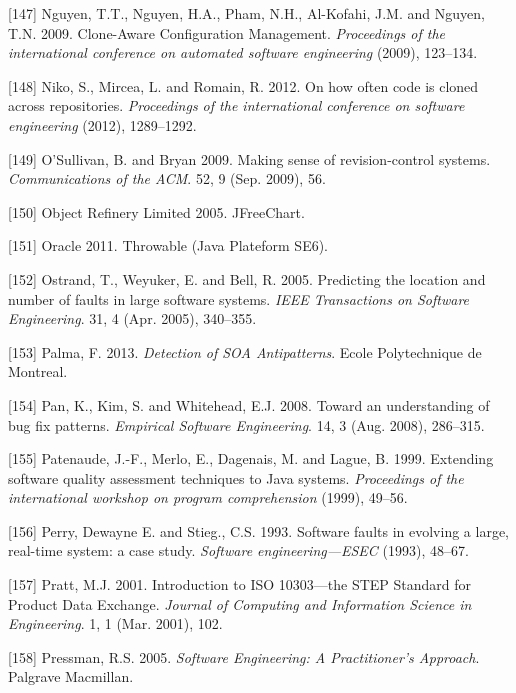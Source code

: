 \documentclass[12pt]{report}
\begin{document}
\hypertarget{ref-Nguyen2009}{}
{[}147{]} Nguyen, T.T., Nguyen, H.A., Pham, N.H., Al-Kofahi, J.M. and
Nguyen, T.N. 2009. Clone-Aware Configuration Management.
\emph{Proceedings of the international conference on automated software
engineering} (2009), 123--134.

\hypertarget{ref-Niko2012}{}
{[}148{]} Niko, S., Mircea, L. and Romain, R. 2012. On how often code is
cloned across repositories. \emph{Proceedings of the international
conference on software engineering} (2012), 1289--1292.

\hypertarget{ref-OSullivan2009}{}
{[}149{]} O'Sullivan, B. and Bryan 2009. Making sense of
revision-control systems. \emph{Communications of the ACM}. 52, 9 (Sep.
2009), 56.

\hypertarget{ref-ObjectRefineryLimited2005}{}
{[}150{]} Object Refinery Limited 2005. JFreeChart.

\hypertarget{ref-Oracle2011}{}
{[}151{]} Oracle 2011. Throwable (Java Plateform SE6).

\hypertarget{ref-Ostrand2005}{}
{[}152{]} Ostrand, T., Weyuker, E. and Bell, R. 2005. Predicting the
location and number of faults in large software systems. \emph{IEEE
Transactions on Software Engineering}. 31, 4 (Apr. 2005), 340--355.

\hypertarget{ref-Palma2013}{}
{[}153{]} Palma, F. 2013. \emph{Detection of SOA Antipatterns}. Ecole
Polytechnique de Montreal.

\hypertarget{ref-Pan2008}{}
{[}154{]} Pan, K., Kim, S. and Whitehead, E.J. 2008. Toward an
understanding of bug fix patterns. \emph{Empirical Software
Engineering}. 14, 3 (Aug. 2008), 286--315.

\hypertarget{ref-Patenaude1999}{}
{[}155{]} Patenaude, J.-F., Merlo, E., Dagenais, M. and Lague, B. 1999.
Extending software quality assessment techniques to Java systems.
\emph{Proceedings of the international workshop on program
comprehension} (1999), 49--56.

\hypertarget{ref-PerryDewayneE.1993}{}
{[}156{]} Perry, Dewayne E. and Stieg., C.S. 1993. Software faults in
evolving a large, real-time system: a case study. \emph{Software
engineering---ESEC} (1993), 48--67.

\hypertarget{ref-Pratt2001}{}
{[}157{]} Pratt, M.J. 2001. Introduction to ISO 10303---the STEP
Standard for Product Data Exchange. \emph{Journal of Computing and
Information Science in Engineering}. 1, 1 (Mar. 2001), 102.

\hypertarget{ref-Pressman2005}{}
{[}158{]} Pressman, R.S. 2005. \emph{Software Engineering: A
Practitioner's Approach}. Palgrave Macmillan.
\end{document}
